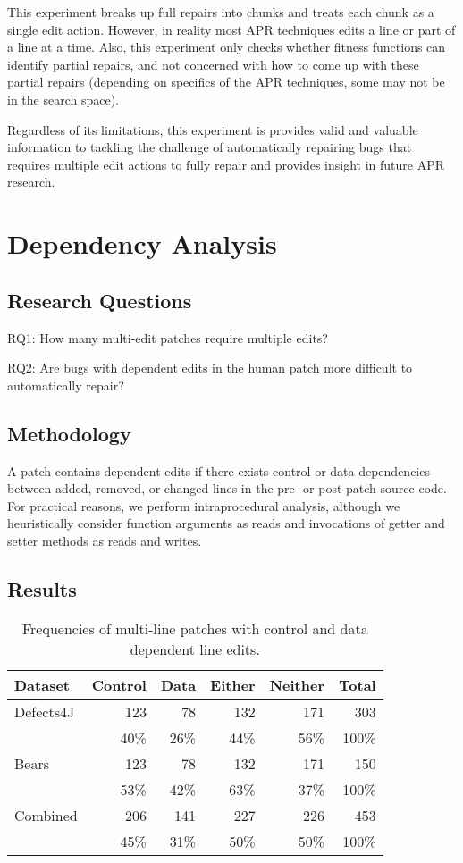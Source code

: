 \documentclass[sigconf, timestamp-false, anonymous=true]{acmart}
\begin{document}
This experiment breaks up full repairs into chunks and treats each chunk as a single edit action. However, in reality most APR techniques edits a line or part of a line at a time. Also, this experiment only checks whether fitness functions can identify partial repairs, and not concerned with how to come up with these partial repairs (depending on specifics of the APR techniques, some may not be in the search space).

Regardless of its limitations, this experiment is provides valid and valuable information to tackling the challenge of automatically repairing bugs that requires multiple edit actions to fully repair and provides insight in future APR research.


\section{Dependency Analysis}
\subsection{Research Questions}

RQ1: How many multi-edit patches require multiple edits?

RQ2: Are bugs with dependent edits in the human patch more difficult to automatically repair?

\subsection{Methodology}
A patch contains dependent edits if there exists control or data dependencies 
between added, removed, or changed lines in the pre- or post-patch
source code. For practical reasons, we perform intraprocedural analysis, 
although we heuristically consider function arguments as reads 
and invocations of getter and setter methods as reads and writes.

\subsection{Results}

\begin{table}
{\begin{center}
	\begin{tabular}{l | rrrr | r}
		\toprule
		Dataset & Control & Data & Either & Neither & Total \\
		\midrule
		Defects4J & 123 & 78 & 132 & 171 & 303 \\
		& 40\% & 26\% & 44\% & 56\% & 100\% \\
		Bears & 123 & 78 & 132 & 171 & 150 \\
		& 53\% & 42\% & 63\% & 37\% & 100\% \\
		\midrule
		Combined & 206 & 141 & 227 & 226 & 453 \\
		& 45\% & 31\% & 50\% & 50\% & 100\% \\
		\bottomrule
	\end{tabular}
 \end{center}
}
	\caption{Frequencies of multi-line patches with control and data dependent line edits.}
	\label{tab:dependency-frequencies}
\end{table}
\end{document}
